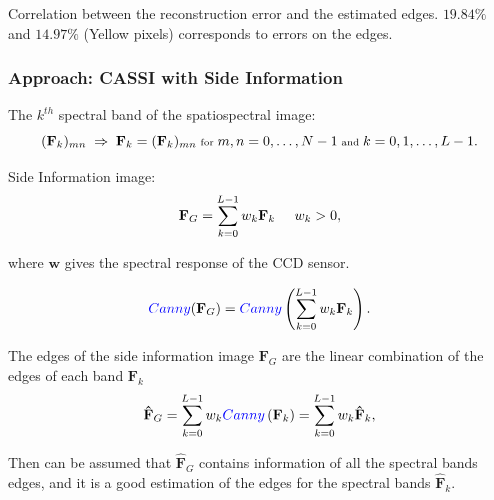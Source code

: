\documentclass{beamer}
\begin{document}
\begin{frame}
\footnotesize{Correlation between the reconstruction error and the estimated edges. $19.84\%$ and $14.97\%$ (Yellow pixels) corresponds to errors on the edges.}

\end{frame}


\begin{frame}
\frametitle{Approach: CASSI with Side Information}


\scriptsize{The $k^{th}$ spectral band of the spatiospectral image:}
\begin{equation*}
\scriptsize
(\mathbf{F}_k)_{mn} \; \Rightarrow \; \mathbf{F}_k=(\mathbf{F}_k)_{mn} \mbox{ for } m,n = 0,\ldots,N-1 \mbox{ and } k=0,1,\ldots,L-1.
\end{equation*}

\scriptsize{Side Information image:}
\begin{equation*}
\scriptsize
\mathbf{F}_G=\sum_{k=0}^{L-1} w_k \mathbf{F}_k \;\;\;\;\; w_k>0,
\label{Eq:Grayscale}
\end{equation*}

\scriptsize{where $\mathbf{w}$ gives the spectral response of the CCD sensor.}

\begin{equation*}
\textcolor{blue}{Canny}(\mathbf{F}_G) = \textcolor{blue}{Canny}\left(\sum_{k=0}^{L-1} w_k \mathbf{F}_k\right).
\label{Eq:GrayscaleEdges1}
\end{equation*}

\scriptsize{The edges of the side information image $\mathbf{F}_G$ are the linear combination of the edges of each band $\mathbf{F}_k$}
\begin{equation*}
\mathbf{\hat{F}}_G = \sum_{k=0}^{L-1} w_k \textcolor{blue}{Canny} \left( \mathbf{F}_k \right) = \sum_{k=0}^{L-1} w_k \mathbf{\hat{F}}_k,
\end{equation*}

\scriptsize{Then can be assumed that $\mathbf{\hat{F}}_G$ contains information of all the spectral bands edges, and it is a good estimation of the edges for the spectral bands $\mathbf{\hat{F}}_k$.}

\end{frame}
\end{document}
